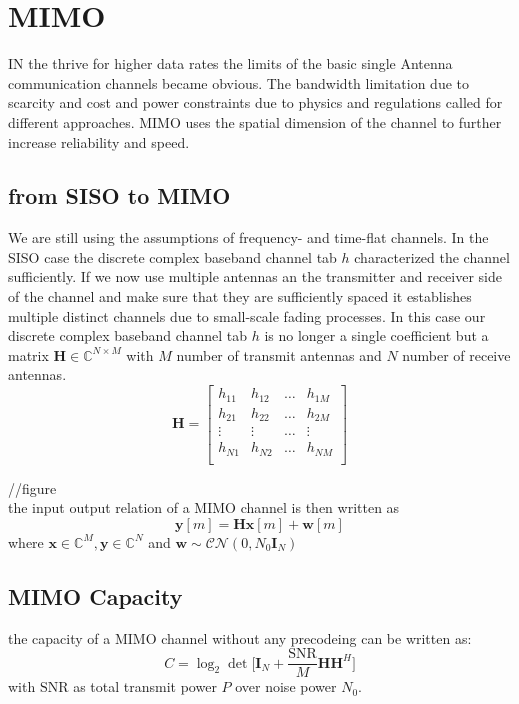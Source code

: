 \section{MIMO}
IN the thrive for higher data rates the limits of the basic single Antenna communication channels became obvious. The bandwidth limitation due to scarcity and cost and power constraints due to physics and regulations called for different approaches. MIMO uses the spatial dimension of the channel to further increase reliability and speed.

\subsection{from SISO to MIMO}
We are still using the assumptions of frequency- and time-flat channels. In the SISO case the discrete complex baseband channel tab $h$ characterized the channel sufficiently. If we now use multiple antennas an the transmitter and receiver side of the channel and make sure that they are sufficiently spaced it establishes multiple distinct channels due to small-scale fading processes. In this case our discrete complex baseband channel tab $h$ is no longer a single coefficient but a matrix $\mathbf{H}\in\mathbb{C}^{N\times M}$ with $M$ number of transmit antennas and $N$ number of receive antennas. 
\begin{equation}
	\mathbf{H} = \begin{bmatrix}
		h_{11} & h_{12} & \hdots & h_{1M} \\
		h_{21} & h_{22} & \hdots & h_{2M} \\
		\vdots & \vdots & \hdots & \vdots \\
		h_{N1} & h_{N2} & \hdots & h_{NM} \\
	\end{bmatrix}
\end{equation}

//figure \\
the input output relation of a MIMO channel is then written as 
\begin{equation}
\mathbf{y}[m] = \mathbf{Hx}[m] + \mathbf{w}[m]
\end{equation}
where $\mathbf{x}\in\mathbb{C}^M , \mathbf{y}\in\mathbb{C}^N$ and $\mathbf{w}\sim\mathcal{CN}(0,N_0\mathbf{I}_N)$


\subsection{MIMO Capacity}
the capacity of a MIMO channel without any precodeing can be written as:
\begin{equation}
	C = \log_2{\det{\Biggr[\mathbf{I}_N + \frac{\text{SNR}}{M}\mathbf{HH}^H\Biggl]}}
\end{equation}
with $\text{SNR}$ as total transmit power $P$ over noise power $N_0$.


